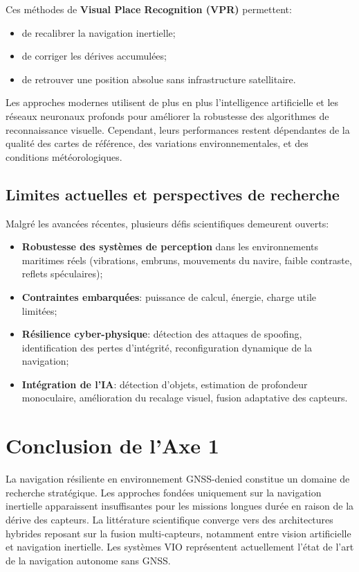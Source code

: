 \documentclass[12pt, a4paper, twoside, openright]{report}
\begin{document}
Ces méthodes de \textbf{Visual Place Recognition (VPR)} permettent:
\begin{itemize}
    \item de recalibrer la navigation inertielle;
    \item de corriger les dérives accumulées;
    \item de retrouver une position absolue sans infrastructure satellitaire.
\end{itemize}

Les approches modernes utilisent de plus en plus l’intelligence artificielle et les réseaux neuronaux profonds pour améliorer la robustesse des algorithmes de reconnaissance visuelle. Cependant, leurs performances restent dépendantes de la qualité des cartes de référence, des variations environnementales, et des conditions météorologiques.

\subsection{Limites actuelles et perspectives de recherche}
Malgré les avancées récentes, plusieurs défis scientifiques demeurent ouverts:
\begin{itemize}
    \item \textbf{Robustesse des systèmes de perception} dans les environnements maritimes réels (vibrations, embruns, mouvements du navire, faible contraste, reflets spéculaires);
    \item \textbf{Contraintes embarquées}: puissance de calcul, énergie, charge utile limitées;
    \item \textbf{Résilience cyber-physique}: détection des attaques de spoofing, identification des pertes d’intégrité, reconfiguration dynamique de la navigation;
    \item \textbf{Intégration de l’IA}: détection d’objets, estimation de profondeur monoculaire, amélioration du recalage visuel, fusion adaptative des capteurs.
\end{itemize}

\section{Conclusion de l'Axe 1}
La navigation résiliente en environnement GNSS-denied constitue un domaine de recherche stratégique. Les approches fondées uniquement sur la navigation inertielle apparaissent insuffisantes pour les missions longues durée en raison de la dérive des capteurs. La littérature scientifique converge vers des architectures hybrides reposant sur la fusion multi-capteurs, notamment entre vision artificielle et navigation inertielle. Les systèmes VIO représentent actuellement l’état de l’art de la navigation autonome sans GNSS.
\end{document}
